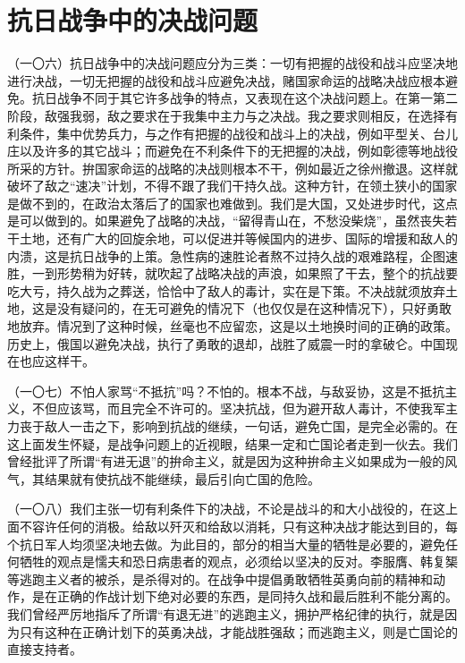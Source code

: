 \section{抗日战争中的决战问题}

（一〇六）抗日战争中的决战问题应分为三类：一切有把握的战役和战斗应坚决地进行决战，一切无把握的战役和战斗应避免决战，赌国家命运的战略决战应根本避免。抗日战争不同于其它许多战争的特点，又表现在这个决战问题上。在第一第二阶段，敌强我弱，敌之要求在于我集中主力与之决战。我之要求则相反，在选择有利条件，集中优势兵力，与之作有把握的战役和战斗上的决战，例如平型关、台儿庄以及许多的其它战斗；而避免在不利条件下的无把握的决战，例如彰德等地战役所采的方针。拚国家命运的战略的决战则根本不干，例如最近之徐州撤退。这样就破坏了敌之“速决”计划，不得不跟了我们干持久战。这种方针，在领土狭小的国家是做不到的，在政治太落后了的国家也难做到。我们是大国，又处进步时代，这点是可以做到的。如果避免了战略的决战，“留得青山在，不愁没柴烧”，虽然丧失若干土地，还有广大的回旋余地，可以促进并等候国内的进步、国际的增援和敌人的内溃，这是抗日战争的上策。急性病的速胜论者熬不过持久战的艰难路程，企图速胜，一到形势稍为好转，就吹起了战略决战的声浪，如果照了干去，整个的抗战要吃大亏，持久战为之葬送，恰恰中了敌人的毒计，实在是下策。不决战就须放弃土地，这是没有疑问的，在无可避免的情况下（也仅仅是在这种情况下），只好勇敢地放弃。情况到了这种时候，丝毫也不应留恋，这是以土地换时间的正确的政策。历史上，俄国以避免决战，执行了勇敢的退却，战胜了威震一时的拿破仑。中国现在也应这样干。

（一〇七）不怕人家骂“不抵抗”吗？不怕的。根本不战，与敌妥协，这是不抵抗主义，不但应该骂，而且完全不许可的。坚决抗战，但为避开敌人毒计，不使我军主力丧于敌人一击之下，影响到抗战的继续，一句话，避免亡国，是完全必需的。在这上面发生怀疑，是战争问题上的近视眼，结果一定和亡国论者走到一伙去。我们曾经批评了所谓“有进无退”的拚命主义，就是因为这种拚命主义如果成为一般的风气，其结果就有使抗战不能继续，最后引向亡国的危险。

（一〇八）我们主张一切有利条件下的决战，不论是战斗的和大小战役的，在这上面不容许任何的消极。给敌以歼灭和给敌以消耗，只有这种决战才能达到目的，每个抗日军人均须坚决地去做。为此目的，部分的相当大量的牺牲是必要的，避免任何牺牲的观点是懦夫和恐日病患者的观点，必须给以坚决的反对。李服膺、韩复榘等逃跑主义者的被杀，是杀得对的。在战争中提倡勇敢牺牲英勇向前的精神和动作，是在正确的作战计划下绝对必要的东西，是同持久战和最后胜利不能分离的。我们曾经严厉地指斥了所谓“有退无进”的逃跑主义，拥护严格纪律的执行，就是因为只有这种在正确计划下的英勇决战，才能战胜强敌；而逃跑主义，则是亡国论的直接支持者。

